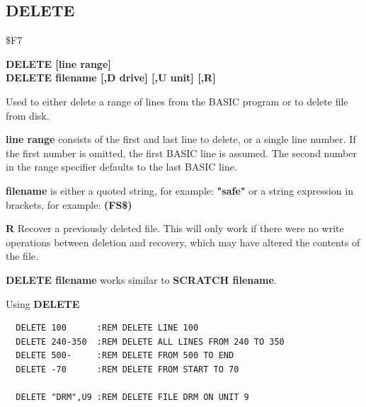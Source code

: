 \subsection{DELETE}
\begin{description}[leftmargin=2cm,style=nextline]
\item [Token:] \$F7
\item [Format:] {\bf DELETE [line range]} \\
                {\bf DELETE filename [,D drive] [,U unit] [,R]}
\item [Usage:] Used to either delete
               a range of lines from the BASIC program or to delete file from disk.

               {\bf line range} consists of the first and last
               line to delete, or a single line number.
               If the first number is omitted, the
               first BASIC line is assumed.
               The second number in the range specifier defaults
               to the last BASIC line.

   {\bf filename} is either a quoted string, for example: {\bf "safe"} or
   a string expression in brackets, for example: {\bf (FS\$)}

   \drivedefinition

   \unitdefinition

   {\bf R} Recover a previously deleted file.
   This will only work if there were no write operations
   between deletion and recovery, which may have altered the
   contents of the file.

\item [Remarks:] {\bf DELETE filename} works similar to
                 {\bf SCRATCH filename}.

\item [Examples:] Using {\bf DELETE}
\begin{tcolorbox}[colback=black,coltext=white]
\verbatimfont{\codefont}
\begin{verbatim}
  DELETE 100      :REM DELETE LINE 100
  DELETE 240-350  :REM DELETE ALL LINES FROM 240 TO 350
  DELETE 500-     :REM DELETE FROM 500 TO END
  DELETE -70      :REM DELETE FROM START TO 70

  DELETE "DRM",U9 :REM DELETE FILE DRM ON UNIT 9
\end{verbatim}
\end{tcolorbox}
\end{description}


